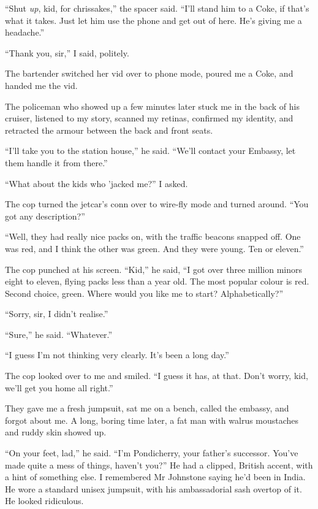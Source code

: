 ``Shut \emph{up}, kid, for chrissakes,'' the spacer said.
``I'll stand him to a Coke, if that's what it takes. Just let him use the phone 
and get out of here. He's giving me a headache.''

``Thank you, sir,'' I said, politely.

The bartender switched her vid over to phone mode, poured me a
Coke, and handed me the vid.

\tb

The policeman who showed up a few minutes later stuck me in the
back of his cruiser, listened to my story, scanned my retinas,
confirmed my identity, and retracted the armour between the back
and front seats.

``I'll take you to the station house,'' he said.
``We'll contact your Embassy, let them handle it from there.''

``What about the kids who 'jacked me?'' I asked.

The cop turned the jetcar's conn over to wire-fly mode and turned
around. ``You got any description?''

``Well, they had really nice packs on, with the traffic beacons snapped off. 
One was red, and I think the other was green. And they were young. Ten or 
eleven.''

The cop punched at his screen. ``Kid,'' he said,
``I got over three million minors eight to eleven, flying packs less than a 
year old. The most popular colour is red. Second choice, green. Where would you 
like me to start? Alphabetically?''

``Sorry, sir, I didn't realise.''

``Sure,'' he said. ``Whatever.''

``I guess I'm not thinking very clearly. It's been a long day.''

The cop looked over to me and smiled.
``I guess it has, at that. Don't worry, kid, we'll get you home all right.''

\tb

They gave me a fresh jumpsuit, sat me on a bench, called the
embassy, and forgot about me. A long, boring time later, a fat man
with walrus moustaches and ruddy skin showed up.

``On your feet, lad,'' he said.
``I'm Pondicherry, your father's successor. You've made quite a mess of things, 
haven't you?''
He had a clipped, British accent, with a hint of something else. I
remembered Mr Johnstone saying he'd been in India. He wore a
standard unisex jumpsuit, with his ambassadorial sash overtop of
it. He looked ridiculous.

